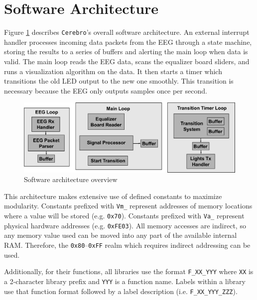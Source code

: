 \documentclass[letterpaper,10pt,notitlepage]{report}
\newcommand{\projname}{\texttt{Cerebro}}
\newcommand{\dat}[1]{\texttt{#1}}
\begin{document}
\section{Software Architecture}

    Figure \ref{fig:swarch} describes \projname{}'s overall software
    architecture.  An external interrupt handler processes incoming data
    packets from the EEG through a state machine, storing the results to a
    series of buffers and alerting the main loop when data is valid.  The main
    loop reads the EEG data, scans the equalizer board sliders, and runs a
    visualization algorithm on the data.  It then starts a timer which
    transitions the old LED output to the new one smoothly.  This transition is
    necessary because the EEG only outputs samples once per second.

        \begin{figure}[h!]
        \begin{center}
            \includegraphics[scale=.4]{fig/software.pdf}
            \caption{Software architecture overview}
            \label{fig:swarch}
        \end{center}
        \end{figure}

    This architecture makes extensive use of defined constants to maximize
    modularity.  Constants prefixed with \dat{Vm\_} represent addresses of
    memory locations where a value will be stored (e.g. \dat{0x70}).  Constants
    prefixed with \dat{Va\_} represent physical hardware addresses (e.g.
    \dat{0xFE03}).  All memory accesses are indirect, so any memory value used
    can be moved into any part of the available internal RAM.  Therefore, the
    \dat{0x80}--\dat{0xFF} realm which requires indirect addressing can be
    used.

    Additionally, for their functions, all libraries use the format
    \dat{F\_XX\_YYY} where \dat{XX} is a 2-character library prefix and
    \dat{YYY} is a function name.  Labels within a library use that function
    format followed by a label description (i.e. \dat{F\_XX\_YYY\_ZZZ}).
\end{document}
